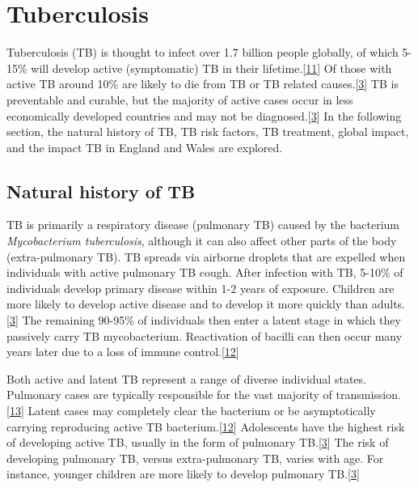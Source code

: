 \documentclass[11pt,twoside]{bristolthesis}
\begin{document}
  \hypertarget{tuberculosis}{%
  \section{Tuberculosis}\label{tuberculosis}}
  
  Tuberculosis (TB) is thought to infect over 1.7 billion people globally, of which 5-15\% will develop active (symptomatic) TB in their lifetime.{[}\protect\hyperlink{ref-Houben:2016jp}{11}{]} Of those with active TB around 10\% are likely to die from TB or TB related causes.{[}\protect\hyperlink{ref-TheWorldHealthOrganization:2018va}{3}{]} TB is preventable and curable, but the majority of active cases occur in less economically developed countries and may not be diagnosed.{[}\protect\hyperlink{ref-TheWorldHealthOrganization:2018va}{3}{]} In the following section, the natural history of TB, TB risk factors, TB treatment, global impact, and the impact TB in England and Wales are explored.
  
  \hypertarget{natural-history-of-tb}{%
  \subsection{Natural history of TB}\label{natural-history-of-tb}}
  
  TB is primarily a respiratory disease (pulmonary TB) caused by the bacterium \emph{Mycobacterium tuberculosis}, although it can also affect other parts of the body (extra-pulmonary TB). TB spreads via airborne droplets that are expelled when individuals with active pulmonary TB cough. After infection with TB, 5-10\% of individuals develop primary disease within 1-2 years of exposure. Children are more likely to develop active disease and to develop it more quickly than adults.{[}\protect\hyperlink{ref-TheWorldHealthOrganization:2018va}{3}{]} The remaining 90-95\% of individuals then enter a latent stage in which they passively carry TB mycobacterium. Reactivation of bacilli can then occur many years later due to a loss of immune control.{[}\protect\hyperlink{ref-Gideon2011a}{12}{]}
  
  Both active and latent TB represent a range of diverse individual states. Pulmonary cases are typically responsible for the vast majority of transmission.{[}\protect\hyperlink{ref-Sepkowitz1996}{13}{]} Latent cases may completely clear the bacterium or be asymptotically carrying reproducing active TB bacterium.{[}\protect\hyperlink{ref-Gideon2011a}{12}{]} Adolescents have the highest risk of developing active TB, usually in the form of pulmonary TB.{[}\protect\hyperlink{ref-TheWorldHealthOrganization:2018va}{3}{]} The risk of developing pulmonary TB, versus extra-pulmonary TB, varies with age. For instance, younger children are more likely to develop pulmonary TB.{[}\protect\hyperlink{ref-TheWorldHealthOrganization:2018va}{3}{]}
  
\end{document}

